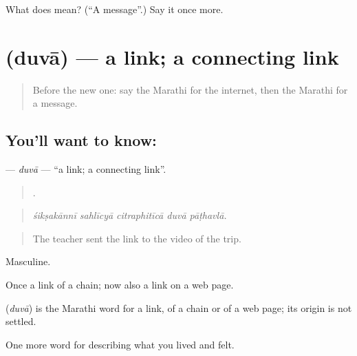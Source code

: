 \begin{tcolorbox}[breakable,colback=teal!4,colframe=teal!35!black,title={Before you move on}]
What does  mean? (\textquotedblleft{}A message\textquotedblright{}.) Say it once more.
\end{tcolorbox}
\section[\texorpdfstring{\mr{दुवा} (duvā)}{दुवा (duvā)}]{ (duvā) — a link; a connecting link}

\label{lesson:MR-C517-duva}



\begin{quote}
Before the new one: say the Marathi for the internet, then the Marathi for a message.
\end{quote}

\subsection*{You'll want to know: }
\textbf{} — \emph{duvā} — \textquotedblleft{}a link; a connecting link\textquotedblright{}.

\begin{quote}
    .
\end{quote}

\begin{quote}
\emph{śikṣakānnī sahlīcyā citraphitīcā duvā pāṭhavlā.}
\end{quote}

\begin{quote}
The teacher sent the link to the video of the trip.
\end{quote}

Masculine.

Once a link of a chain; now also a link on a web page.

\begin{cousinweb}
\textbf{} (\emph{duvā}) is the Marathi word for a link, of a chain or of a web page; its origin is not settled.
\end{cousinweb}

\begin{grammarlens}[title={What you've built}]
One more word for describing what you lived and felt.
\end{grammarlens}

